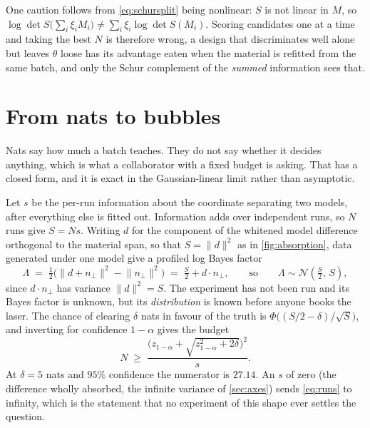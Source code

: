 \documentclass[10pt]{article}
\begin{document}
One caution follows from \eqref{eq:schursplit} being nonlinear: $S$ is not linear in $M$, so
$\log\det S\big(\sum_i \xi_i M_i\big) \ne \sum_i \xi_i \log\det S(M_i)$. Scoring candidates one
at a time and taking the best $N$ is therefore wrong, a design that discriminates well alone
but leaves $\theta$ loose has its advantage eaten when the material is refitted from the same
batch, and only the Schur complement of the \emph{summed} information sees that.

\section{From nats to bubbles}

Nats say how much a batch teaches. They do not say whether it decides anything, which is what a
collaborator with a fixed budget is asking. That has a closed form, and it is exact in the
Gaussian-linear limit rather than asymptotic.

Let $s$ be the per-run information about the coordinate separating two models, after everything
else is fitted out. Information adds over independent runs, so $N$ runs give $S = Ns$. Writing
$d$ for the component of the whitened model difference orthogonal to the material span, so that
$S = \lVert d \rVert^2$ as in \cref{fig:absorption}, data generated under one model give a
profiled log Bayes factor
%
\begin{equation}
\Lambda \;=\; \tfrac12\big(\lVert d + n_\perp\rVert^2 - \lVert n_\perp\rVert^2\big)
\;=\; \tfrac{S}{2} + d\cdot n_\perp ,
\qquad\text{so}\qquad
\Lambda \sim \mathcal{N}\!\left(\tfrac{S}{2},\, S\right) ,
\label{eq:lambdalaw}
\end{equation}
%
since $d \cdot n_\perp$ has variance $\lVert d\rVert^2 = S$. The experiment has not been run and
its Bayes factor is unknown, but its \emph{distribution} is known before anyone books the
laser. The chance of clearing $\delta$ nats in favour of the truth is
$\Phi\big((S/2-\delta)/\sqrt{S}\big)$, and inverting for confidence $1-\alpha$ gives the budget
%
\begin{equation}
N \;\ge\; \frac{\big(z_{1-\alpha} + \sqrt{z_{1-\alpha}^2 + 2\delta}\big)^2}{s} .
\label{eq:runs}
\end{equation}
%
At $\delta = 5$ nats and $95\%$ confidence the numerator is $27.14$. An $s$ of zero (the
difference wholly absorbed, the infinite variance of \cref{sec:axes}) sends \eqref{eq:runs}
to infinity, which is the statement that no experiment of this shape ever settles the question.
\end{document}
